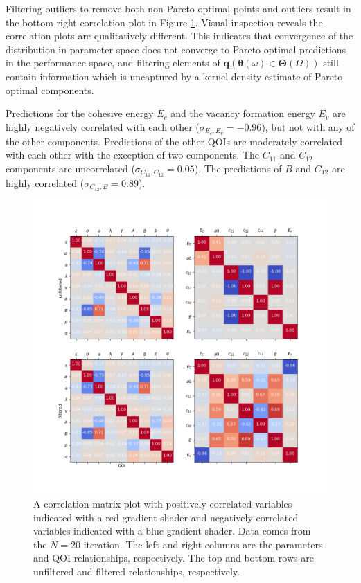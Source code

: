 Filtering outliers to remove both non-Pareto optimal points and outliers result in the bottom right correlation plot in Figure \ref{fig:Si_correlation_plots}.  Visual inspection reveals the correlation plots are qualitatively different.  This indicates that convergence of the distribution in parameter space does not converge to Pareto optimal predictions in the performance space, and filtering elements of $\bm{q}(\bm{\theta}(\omega) \in \bm{\Theta}(\Omega))$ still contain information which is uncaptured by a kernel density estimate of Pareto optimal components.

Predictions for the cohesive energy $E_c$ and the vacancy formation energy $E_v$ are highly negatively correlated with each other ($\sigma_{E_c,E_v}=-0.96$), but not with any of the other components.  Predictions of the other QOIs are moderately correlated with each other with the exception of two components.  The $C_{11}$ and $C_{12}$ components are uncorrelated ($\sigma_{C_{11},C_{12}}=0.05$).  The predictions of $B$ and $C_{12}$ are highly correlated ($\sigma_{C_{12},B}=0.89$).

\begin{figure}[ht]
  \centering
  \includegraphics[width=5in]{chapter8/fig_cov_19}
  \caption{A correlation matrix plot with positively correlated variables indicated with a red gradient shader and negatively correlated variables indicated with a blue gradient shader.  Data comes from the $N=20$ iteration.  The left and right columns are the parameters and QOI relationships, respectively.  The top and bottom rows are unfiltered and filtered relationships, respectively.}
  \label{fig:Si_correlation_plots}
\end{figure}

